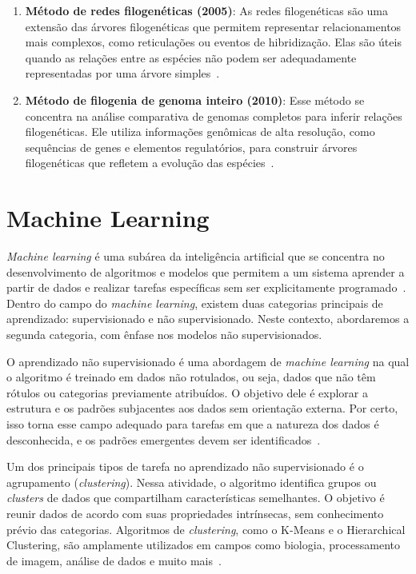 \begin{enumerate}
  \item \textbf{Método de redes filogenéticas (2005)}: As redes filogenéticas são uma extensão das árvores filogenéticas que permitem representar relacionamentos mais complexos, como reticulações ou eventos de hibridização. Elas são úteis quando as relações entre as espécies não podem ser adequadamente representadas por uma árvore simples~\cite{huson_phylogenetic_networks_2006}.
  \item \textbf{Método de filogenia de genoma inteiro (2010)}: Esse método se concentra na análise comparativa de genomas completos para inferir relações filogenéticas. Ele utiliza informações genômicas de alta resolução, como sequências de genes e elementos regulatórios, para construir árvores filogenéticas que refletem a evolução das espécies~\cite{eisen_horizontal_gene_transfre_2000}.
\end{enumerate}

\section{Machine Learning}
\textit{Machine learning} é uma subárea da inteligência artificial que se concentra no desenvolvimento de algoritmos e modelos que permitem a um sistema aprender a partir de dados e realizar tarefas específicas sem ser explicitamente programado~\cite{deeplearning_goodfellow_2016}. Dentro do campo do \textit{machine learning}, existem duas categorias principais de aprendizado: supervisionado e não supervisionado. Neste contexto, abordaremos a segunda categoria, com ênfase nos modelos não supervisionados.

O aprendizado não supervisionado é uma abordagem de \textit{machine learning} na qual o algoritmo é treinado em dados não rotulados, ou seja, dados que não têm rótulos ou categorias previamente atribuídos. O objetivo dele é explorar a estrutura e os padrões subjacentes aos dados sem orientação externa. Por certo, isso torna esse campo adequado para tarefas em que a natureza dos dados é desconhecida, e os padrões emergentes devem ser identificados~\cite{machine_learning_bishop_2006}.

Um dos principais tipos de tarefa no aprendizado não supervisionado é o agrupamento (\textit{clustering}). Nessa atividade, o algoritmo identifica grupos ou \textit{clusters} de dados que compartilham características semelhantes. O objetivo é reunir dados de acordo com suas propriedades intrínsecas, sem conhecimento prévio das categorias. Algoritmos de \textit{clustering}, como o K-Means e o Hierarchical Clustering, são amplamente utilizados em campos como biologia, processamento de imagem, análise de dados e muito mais~\cite{machine_learning_bishop_2006}.

